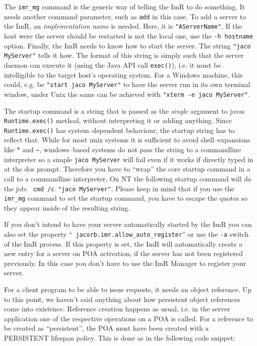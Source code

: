 \documentclass[12pt]{scrbook}
\begin{document}

The {\tt imr\_mg} command is the  generic way of telling the ImR to do
something. It  needs another command  parameter, such as {\tt  add} in
this case. To add a server to the ImR, an {\em implementation name} is
needed. Here, it is {\tt  "AServerName"}.  If the host were the server
should be  restarted is not the  local one, use the  {\tt -h hostname}
option.  Finally, the  ImR needs to know how to  start the server. The
string {\tt "jaco  MyServer"} tells it how. The  format of this string
is simply such  that the server daemon can execute  it (using the Java
API call  {\tt exec()}), i.e.  it  must be intelligible  to the target
host's operating system.   For a Windows machine, this  could, e.g. be
{\tt "start jaco MyServer"} to have the server run in its own terminal
window, under Unix  the same can be achieved with  {\tt "xterm -e jaco
MyServer"}.

The startup  command is a  string that is  passed as the  {\em single}
argument to javas {\tt Runtime.exec()} method, without interpreting it
or adding  anything. Since {\tt  Runtime.exec()} has system--dependent
behaviour, the startup string has to reflect that. While for most unix
systems  it  is  sufficient  to  avoid shell--expansions  like  *  and
\verb+~+,  windows--based  systems  do   not  pass  the  string  to  a
commandline interpreter so a simple {\tt jaco MyServer} will fail even
if it works if directly typed in at the dos prompt. Therefore you have
to  ``wrap'' the  core  startup command  in  a call  to a  commandline
interpreter. On NT the following startup command will do the job: {\tt
cmd /c "jaco MyServer"}.  Please keep in mind that if you use the {\tt
imr\_mg} command  to set the startup  command, you have  to escape the
quotes so they appear inside of the resulting string.

If you don't  intend to have your server  automatically started by the
ImR     you      can     also     set      the     property     ``{\tt
jacorb.imr.allow\_auto\_register}'' or use the  {\tt -a} switch of the
ImR  process. If  this property  is  set, the  ImR will  automatically
create a new  entry for a server on POA activation,  if the server has
not been registered previously. In this case you don't have to use the
ImR Manager to register your server.

For a client program to be  able to issue requests, it needs an object
reference.  Up to  this  point,  we haven't  said  anything about  how
persistent object  references come into  existence. Reference creation
happens as usual, i.e. in the server application one of the respective
operations  on a  POA is  called.  For a  reference to  be created  as
``persistent'',  the POA  must  have been  created  with a  PERSISTENT
lifespan policy. This is done as in the following code snippet:
\end{document}
